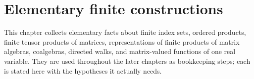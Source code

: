 \chapter{Elementary finite constructions}
\label{ch:elementary_finite_constructions}

This chapter collects elementary facts about finite index sets, ordered
products, finite tensor products of matrices, representations of finite
products of matrix algebras, coalgebras, directed walks, and matrix-valued
functions of one real variable. They are used throughout the later chapters
as bookkeeping steps; each is stated here with the hypotheses it actually
needs.







